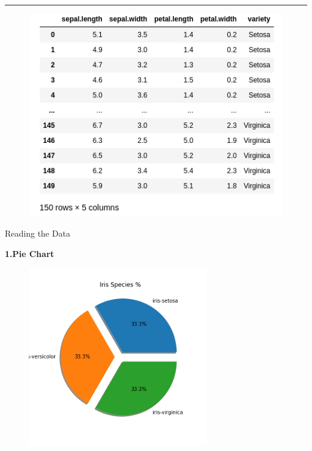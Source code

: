 \documentclass{article}
\title{\color{blue}{ASSIGNMENT 3}}
\author{\Large{\texttt{NAME: \color{red}{Shafikha Yasmeen}      \color{black}{ID}:\color{red}{B192241}}}}
\begin{document}
\maketitle
\hrule
\vspace{1cm}
\Large\color{black}{DATA: }
\begin{figure}[h]
   \centering
    \includegraphics[width=1.1\textwidth]{Data.png}
\end{figure}
\newpage
\Huge{Reading the Data}
\Huge
\vspace{1cm}

\Huge\textbf{1.Pie Chart}
\Large
\begin{figure}[h]
    \centering
    \includegraphics[width=0.7\textwidth]{1.png}
\end{figure}
\newpage
\end{document}
